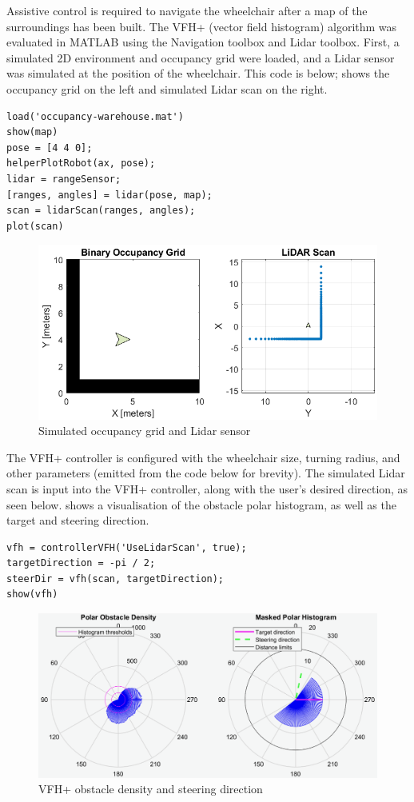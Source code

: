 \documentclass[12pt]{article}
\begin{document}
Assistive control is required to navigate the wheelchair after a map of the surroundings has been built.
The VFH+ (vector field histogram) \cite{ulrichVFHReliableObstacle1998} algorithm was evaluated
in MATLAB using the Navigation toolbox and Lidar toolbox.
First, a simulated 2D environment and occupancy grid were loaded,
and a Lidar sensor was simulated at the position of the wheelchair. This code is below;
 shows the occupancy grid on the left and simulated
Lidar scan on the right.

\begin{verbatim}
load('occupancy-warehouse.mat')
show(map)
pose = [4 4 0];
helperPlotRobot(ax, pose);
lidar = rangeSensor;
[ranges, angles] = lidar(pose, map);
scan = lidarScan(ranges, angles);
plot(scan)
\end{verbatim}

\begin{figure}[H]
    \centering
    \includegraphics[width=0.5\linewidth]{images/simulated_lidar.png}
    \caption{Simulated occupancy grid and Lidar sensor}
    \label{fig:simulated_lidar}
\end{figure}

The VFH+ controller is configured with the wheelchair size,
turning radius, and other parameters (emitted from the code below for brevity).
The simulated Lidar scan is input into the VFH+ controller, along with
the user's desired direction, as seen below.  shows a visualisation
of the obstacle polar histogram, as well as the target and steering direction.

\begin{verbatim}
vfh = controllerVFH('UseLidarScan', true);
targetDirection = -pi / 2;
steerDir = vfh(scan, targetDirection);
show(vfh)
\end{verbatim}

\begin{figure}[H]
    \centering
    \includegraphics[width=0.65\linewidth]{images/vfh_controller.png}
    \caption{VFH+ obstacle density and steering direction}
    \label{fig:vfh_controller}
\end{figure}
\end{document}
